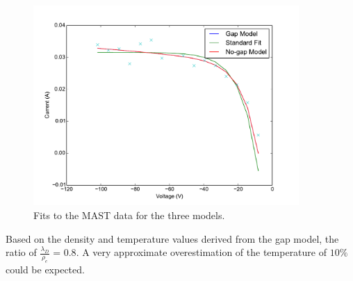 \begin{figure}[H]
\centering
\includegraphics[width=0.9\textwidth]{all_fits.pdf}
\caption{Fits to the MAST data for the three models.}
\label{fig:data_fit}
\end{figure}

Based on the density and temperature values derived from the gap model, the ratio of $\frac{\lambda_D}{\rho_e}$ = $0.8$. A very approximate overestimation of the temperature of $10\%$ could be expected.






%







%
%
%













